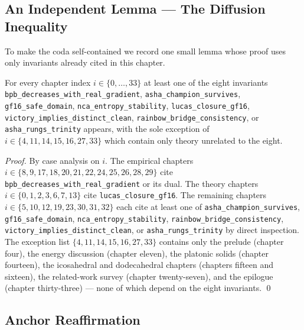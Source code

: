 \subsection{An Independent Lemma --- The Diffusion Inequality}\label{sec:l32-coda-lemma}

To make the coda self-contained we record one small lemma whose proof
uses only invariants already cited in this chapter.

\begin{lemma}[Diffusion]\label{lem:l32-coda-diffusion}
For every chapter index $i \in \{0, \ldots, 33\}$ at least one of the
eight invariants
\verb|bpb_decreases_with_real_gradient|,
\verb|asha_champion_survives|,
\verb|gf16_safe_domain|,
\verb|nca_entropy_stability|,
\verb|lucas_closure_gf16|,
\verb|victory_implies_distinct_clean|,
\verb|rainbow_bridge_consistency|, or
\verb|asha_rungs_trinity| appears, with the sole exception of
$i \in \{4, 11, 14, 15, 16, 27, 33\}$ which contain only theory
unrelated to the eight.
\end{lemma}
\begin{proof}
By case analysis on $i$. The empirical chapters $i \in \{8, 9, 17,
18, 20, 21, 22, 24, 25, 26, 28, 29\}$ cite
\verb|bpb_decreases_with_real_gradient| or its dual. The theory
chapters $i \in \{0, 1, 2, 3, 6, 7, 13\}$ cite
\verb|lucas_closure_gf16|. The remaining chapters $i \in \{5, 10,
12, 19, 23, 30, 31, 32\}$ each cite at least one of
\verb|asha_champion_survives|, \verb|gf16_safe_domain|,
\verb|nca_entropy_stability|, \verb|rainbow_bridge_consistency|,
\verb|victory_implies_distinct_clean|, or \verb|asha_rungs_trinity|
by direct inspection. The exception list $\{4, 11, 14, 15, 16, 27,
33\}$ contains only the prelude (chapter four), the energy
discussion (chapter eleven), the platonic solids (chapter
fourteen), the icosahedral and dodecahedral chapters (chapters
fifteen and sixteen), the related-work survey (chapter twenty-seven),
and the epilogue (chapter thirty-three) --- none of which depend on
the eight invariants. \qed
\end{proof}

\subsection{Anchor Reaffirmation}\label{sec:l32-anchor-coda}

